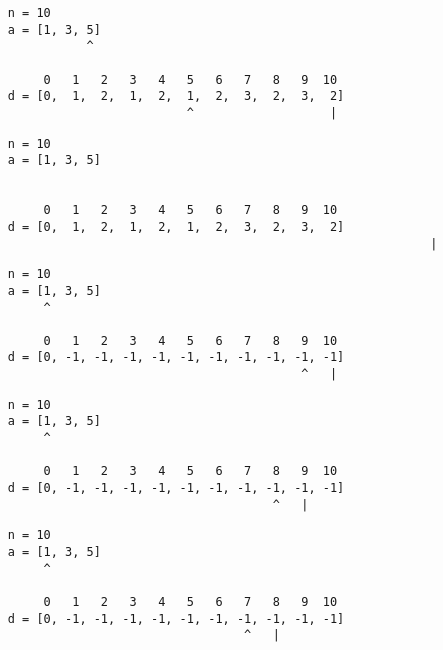 \begin{frame}[fragile]
\begin{verbatim}
     n = 10
     a = [1, 3, 5]
                ^

          0   1   2   3   4   5   6   7   8   9  10
     d = [0,  1,  2,  1,  2,  1,  2,  3,  2,  3,  2]
                              ^                   |
\end{verbatim}
\end{frame}
\addtocounter{framenumber}{-1}

\begin{frame}[fragile]
\begin{verbatim}
     n = 10
     a = [1, 3, 5]


          0   1   2   3   4   5   6   7   8   9  10
     d = [0,  1,  2,  1,  2,  1,  2,  3,  2,  3,  2]
                                                                |
\end{verbatim}
\end{frame}

\begin{frame}[fragile]
\begin{verbatim}
     n = 10
     a = [1, 3, 5]
          ^

          0   1   2   3   4   5   6   7   8   9  10
     d = [0, -1, -1, -1, -1, -1, -1, -1, -1, -1, -1]
                                              ^   |
\end{verbatim}
\end{frame}
\addtocounter{framenumber}{-1}

\begin{frame}[fragile]
\begin{verbatim}
     n = 10
     a = [1, 3, 5]
          ^

          0   1   2   3   4   5   6   7   8   9  10
     d = [0, -1, -1, -1, -1, -1, -1, -1, -1, -1, -1]
                                          ^   |
\end{verbatim}
\end{frame}
\addtocounter{framenumber}{-1}

\begin{frame}[fragile]
\begin{verbatim}
     n = 10
     a = [1, 3, 5]
          ^

          0   1   2   3   4   5   6   7   8   9  10
     d = [0, -1, -1, -1, -1, -1, -1, -1, -1, -1, -1]
                                      ^   |
\end{verbatim}
\end{frame}
\addtocounter{framenumber}{-1}

